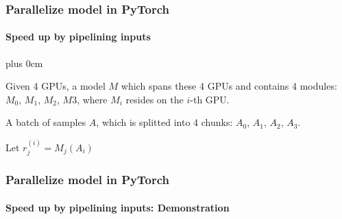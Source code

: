 \documentclass[11pt]{beamer}
\renewcommand{\raggedright}{\leftskip=0pt \rightskip=0pt plus 0cm}
\let\olditemize=\itemize
\renewenvironment{itemize}{\olditemize\raggedright}{\endlist}
\begin{document}
\begin{frame}
\frametitle{Parallelize model in PyTorch}
\framesubtitle{Speed up by pipelining inputs}
\begin{itemize}
	\item Given 4 GPUs, a model $M$ which spans these 4 GPUs and contains 4 modules: $M_0$, $M_1$, $M_2$, $M3$, where $M_i$ resides on the $i$-th GPU.
	\item A batch of samples $A$, which is splitted into 4 chunks: $A_0$, $A_1$, $A_2$, $A_3$.\\[10pt]
	\item Let $r^{(i)}_j = M_j(A_i)$
\end{itemize}
\end{frame}
\begin{frame}
	\frametitle{Parallelize model in PyTorch}
	\framesubtitle{Speed up by pipelining inputs: Demonstration}
\end{frame}
\end{document}
